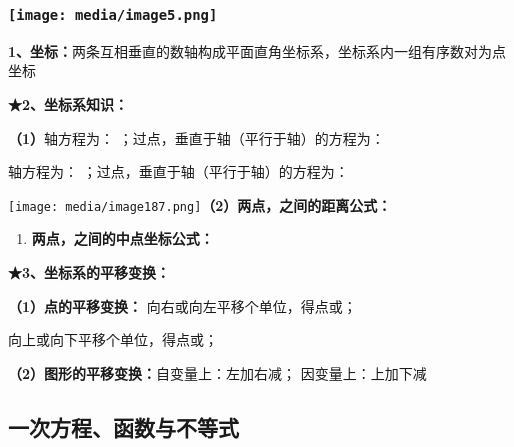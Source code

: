\documentclass[a4paper,11pt,UTF8]{ctexart}
\begin{document}
\hypertarget{ux5b66ux79d1ux7f51www.zxxk.com--ux6559ux80b2ux8d44ux6e90ux95e8ux6237ux63d0ux4f9bux8bd5ux9898ux8bd5ux5377ux6559ux6848ux8bfeux4ef6ux6559ux5b66ux8bbaux6587ux7d20ux6750ux7b49ux5404ux7c7bux6559ux5b66ux8d44ux6e90ux5e93ux4e0bux8f7dux8fd8ux6709ux5927ux91cfux4e30ux5bccux7684ux6559ux5b66ux8d44ux8baf-30}{%
\subsubsection{\texorpdfstring{\protect\texttt{[image: media/image5.png]}}{学科网(www.zxxk.com)-\/-教育资源门户，提供试题试卷、教案、课件、教学论文、素材等各类教学资源库下载，还有大量丰富的教学资讯！}}\label{ux5b66ux79d1ux7f51www.zxxk.com--ux6559ux80b2ux8d44ux6e90ux95e8ux6237ux63d0ux4f9bux8bd5ux9898ux8bd5ux5377ux6559ux6848ux8bfeux4ef6ux6559ux5b66ux8bbaux6587ux7d20ux6750ux7b49ux5404ux7c7bux6559ux5b66ux8d44ux6e90ux5e93ux4e0bux8f7dux8fd8ux6709ux5927ux91cfux4e30ux5bccux7684ux6559ux5b66ux8d44ux8baf-30}}

\textbf{1、坐标：}两条互相垂直的数轴构成平面直角坐标系，坐标系内一组有序数对为点坐标

\textbf{★2、坐标系知识：}

\textbf{（1）}轴方程为： ；过点，垂直于轴（平行于轴）的方程为：

轴方程为： ；过点，垂直于轴（平行于轴）的方程为：

\texttt{[image: media/image187.png]}\textbf{（2）两点，之间的距离公式：}

\begin{enumerate}
\def\labelenumi{\arabic{enumi}.}
\setcounter{enumi}{2}
\item
  \textbf{两点，之间的中点坐标公式：}
\end{enumerate}

\textbf{★3、坐标系的平移变换：}

\textbf{（1）点的平移变换：} 向右或向左平移个单位，得点或；

向上或向下平移个单位，得点或；

\textbf{（2）图形的平移变换：}自变量上：左加右减； 因变量上：上加下减

\hypertarget{ux4e00ux6b21ux65b9ux7a0bux51fdux6570ux4e0eux4e0dux7b49ux5f0f}{%
\subsection{\texorpdfstring{
一次方程、函数与不等式}{ 一次方程、函数与不等式}}\label{ux4e00ux6b21ux65b9ux7a0bux51fdux6570ux4e0eux4e0dux7b49ux5f0f}}
\end{document}
